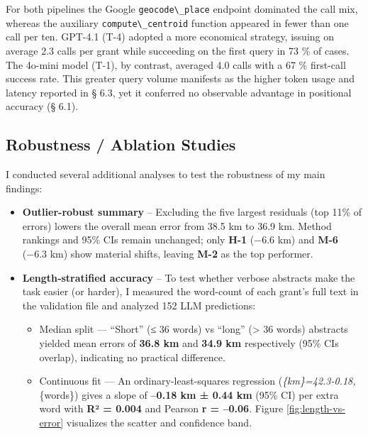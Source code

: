 For both pipelines the Google \passthrough{\lstinline!geocode\_place!}
endpoint dominated the call mix, whereas the auxiliary
\passthrough{\lstinline!compute\_centroid!} function appeared in fewer
than one call per ten. GPT-4.1 (T-4) adopted a more economical strategy,
issuing on average 2.3 calls per grant while succeeding on the first
query in 73 \% of cases. The 4o-mini model (T-1), by contrast, averaged
4.0 calls with a 67 \% first-call success rate. This greater query
volume manifests as the higher token usage and latency reported in §
6.3, yet it conferred no observable advantage in positional accuracy (§
6.1).

\subsection{Robustness / Ablation
Studies}\label{robustness-ablation-studies}

I conducted several additional analyses to test the robustness of my
main findings:

\begin{itemize}
\item
  \textbf{Outlier-robust summary} -- Excluding the five largest
  residuals (top 11\% of errors) lowers the overall mean error from 38.5
  km to 36.9 km. Method rankings and 95\% CIs remain unchanged; only
  \textbf{H-1} \citep{Bashorun2025_gis} (−6.6 km) and \textbf{M-6} (−6.3
  km) show material shifts, leaving \textbf{M-2} as the top performer.
\item
  \textbf{Length‐stratified accuracy} -- To test whether verbose
  abstracts make the task easier (or harder), I measured the word-count
  of each grant's full text in the validation file and analyzed 152 LLM
  predictions:

  \begin{itemize}
  \tightlist
  \item
    Median split --- ``Short'' (≤ 36 words) vs ``long'' (\textgreater{}
    36 words) abstracts yielded mean errors of \textbf{36.8 km} and
    \textbf{34.9 km} respectively (95\% CIs overlap), indicating no
    practical difference.\\
  \item
    Continuous fit --- An ordinary-least-squares regression
    (\emph{\{km\}=42.3-0.18,}\{words\}) gives a
    slope of \textbf{--0.18 km ± 0.44 km} (95\% CI) per extra word with
    \textbf{R² = 0.004} and Pearson \textbf{r = --0.06}. Figure
    \ref{fig:length-vs-error} visualizes the scatter and confidence
    band.
  \end{itemize}
\end{itemize}

